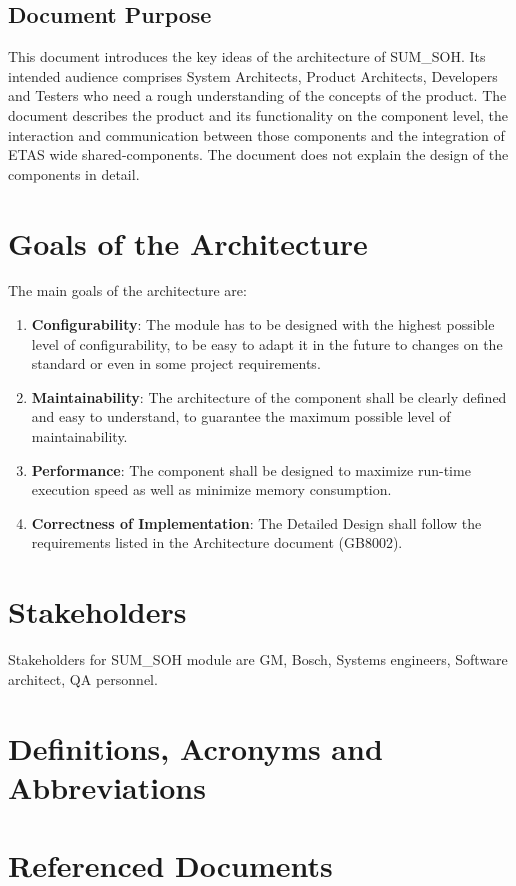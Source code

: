 \subsection{Document Purpose}

This document introduces the key ideas of the architecture of SUM_SOH.
Its intended audience comprises System Architects, Product Architects, Developers and Testers who need a rough understanding of the concepts of the product.
The document describes the product and its functionality on the component level, the interaction and communication between those components and the integration of ETAS wide shared-components.
The document does not explain the design of the components in detail.

\section{Goals of the Architecture}

The main goals of the architecture are:

\begin{enumerate}
\item \textbf{Configurability}: The module has to be designed with the highest possible level of configurability, to be easy to adapt it in the future to changes on the standard or even in some project requirements.
\item \textbf{Maintainability}: The architecture of the component shall be clearly defined and easy to understand, to guarantee the maximum possible level of maintainability.
\item \textbf{Performance}: The component shall be designed to maximize run-time execution speed as well as minimize memory consumption.
\item \textbf{Correctness of Implementation}: The Detailed Design shall follow the requirements listed in the Architecture document (GB8002).
\end{enumerate}

\section{Stakeholders}

Stakeholders for SUM\_SOH module are GM, Bosch, Systems engineers, Software architect, QA personnel.

\section{Definitions, Acronyms and Abbreviations}
\label{sec:Definitions}


\section{Referenced Documents}

